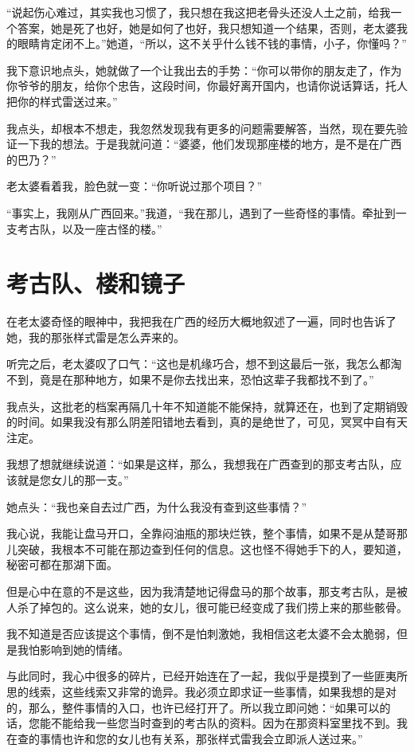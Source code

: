 “说起伤心难过，其实我也习惯了，我只想在我这把老骨头还没人土之前，给我一个答案，她是死了也好，她是如何了也好，我只想知道一个结果，否则，老太婆我的眼睛肯定闭不上。”她道，“所以，这不关乎什么钱不钱的事情，小子，你懂吗？”

我下意识地点头，她就做了一个让我出去的手势：“你可以带你的朋友走了，作为你爷爷的朋友，给你个忠告，这段时间，你最好离开国内，也请你说话算话，托人把你的样式雷送过来。”

我点头，却根本不想走，我忽然发现我有更多的问题需要解答，当然，现在要先验证一下我的想法。于是我就问道：“婆婆，他们发现那座楼的地方，是不是在广西的巴乃？”

老太婆看着我，脸色就一变：“你听说过那个项目？”

“事实上，我刚从广西回来。”我道，“我在那儿，遇到了一些奇怪的事情。牵扯到一支考古队，以及一座古怪的楼。”

\chapter{考古队、楼和镜子}

在老太婆奇怪的眼神中，我把我在广西的经历大概地叙述了一遍，同时也告诉了她，我的那张样式雷是怎么弄来的。

听完之后，老太婆叹了口气：“这也是机缘巧合，想不到这最后一张，我怎么都淘不到，竟是在那种地方，如果不是你去找出来，恐怕这辈子我都找不到了。”

我点头，这批老的档案再隔几十年不知道能不能保持，就算还在，也到了定期销毁的时间。如果我没有那么阴差阳错地去看到，真的是绝世了，可见，冥冥中自有天注定。

我想了想就继续说道：“如果是这样，那么，我想我在广西查到的那支考古队，应该就是您女儿的那一支。”

她点头：“我也亲自去过广西，为什么我没有查到这些事情？”

我心说，我能让盘马开口，全靠闷油瓶的那块烂铁，整个事情，如果不是从楚哥那儿突破，我根本不可能在那边查到任何的信息。这也怪不得她手下的人，要知道，秘密可都在那湖下面。

但是心中在意的不是这些，因为我清楚地记得盘马的那个故事，那支考古队，是被人杀了掉包的。这么说来，她的女儿，很可能已经变成了我们捞上来的那些骸骨。

我不知道是否应该提这个事情，倒不是怕刺激她，我相信这老太婆不会太脆弱，但是我怕影响到她的情绪。

与此同时，我心中很多的碎片，已经开始连在了一起，我似乎是摸到了一些匪夷所思的线索，这些线索又非常的诡异。我必须立即求证一些事情，如果我想的是对的，那么，整件事情的入口，也许已经打开了。所以我立即问她：“如果可以的话，您能不能给我一些您当时查到的考古队的资料。因为在那资料室里找不到。我在查的事情也许和您的女儿也有关系，那张样式雷我会立即派人送过来。”

